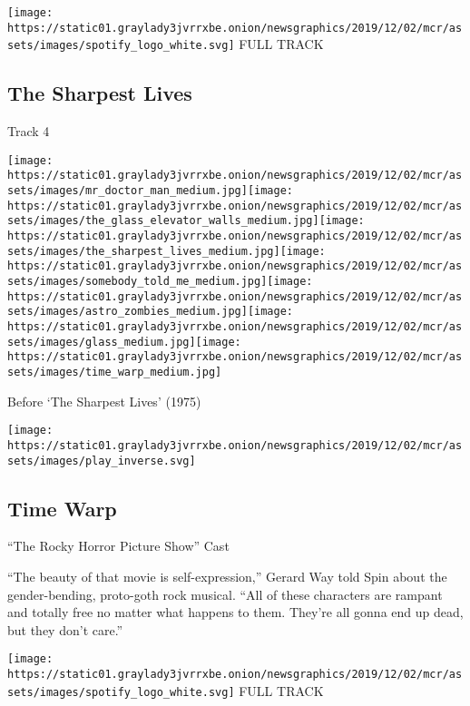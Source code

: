 \href{https://open.spotify.com/track/73GijD6egD0jZ6p7rYnWpj}{}

\texttt{[image: https://static01.graylady3jvrrxbe.onion/newsgraphics/2019/12/02/mcr/assets/images/spotify\_logo\_white.svg]}
FULL TRACK

\hypertarget{the-sharpest-lives}{%
\subsection{The Sharpest Lives}\label{the-sharpest-lives}}

Track 4

\texttt{[image: https://static01.graylady3jvrrxbe.onion/newsgraphics/2019/12/02/mcr/assets/images/mr\_doctor\_man\_medium.jpg]}\texttt{[image: https://static01.graylady3jvrrxbe.onion/newsgraphics/2019/12/02/mcr/assets/images/the\_glass\_elevator\_walls\_medium.jpg]}\texttt{[image: https://static01.graylady3jvrrxbe.onion/newsgraphics/2019/12/02/mcr/assets/images/the\_sharpest\_lives\_medium.jpg]}\texttt{[image: https://static01.graylady3jvrrxbe.onion/newsgraphics/2019/12/02/mcr/assets/images/somebody\_told\_me\_medium.jpg]}\texttt{[image: https://static01.graylady3jvrrxbe.onion/newsgraphics/2019/12/02/mcr/assets/images/astro\_zombies\_medium.jpg]}\texttt{[image: https://static01.graylady3jvrrxbe.onion/newsgraphics/2019/12/02/mcr/assets/images/glass\_medium.jpg]}\texttt{[image: https://static01.graylady3jvrrxbe.onion/newsgraphics/2019/12/02/mcr/assets/images/time\_warp\_medium.jpg]}

Before `The Sharpest Lives' (1975)

\texttt{[image: https://static01.graylady3jvrrxbe.onion/newsgraphics/2019/12/02/mcr/assets/images/play\_inverse.svg]}

\hypertarget{time-warp}{%
\subsection{Time Warp}\label{time-warp}}

``The Rocky Horror Picture Show'' Cast

``The beauty of that movie is self-expression,'' Gerard Way told Spin
about the gender-bending, proto-goth rock musical. ``All of these
characters are rampant and totally free no matter what happens to them.
They're all gonna end up dead, but they don't care.''

\href{https://open.spotify.com/track/4WFeJTXNHIS2wURtwlAkhu}{}

\texttt{[image: https://static01.graylady3jvrrxbe.onion/newsgraphics/2019/12/02/mcr/assets/images/spotify\_logo\_white.svg]}
FULL TRACK

